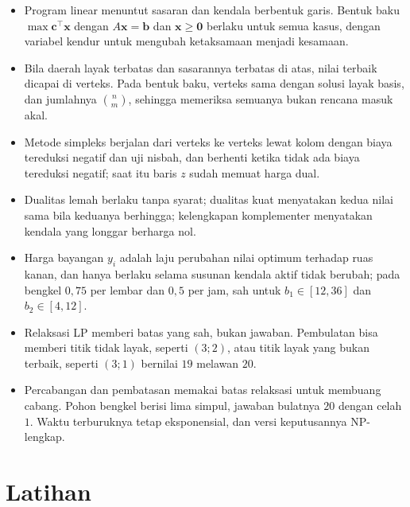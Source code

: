 \begin{ringkasan}
\begin{itemize}
  \item Program linear menuntut sasaran dan kendala berbentuk garis. Bentuk baku
        $\max\mathbf{c}^{\top}\mathbf{x}$ dengan $A\mathbf{x}=\mathbf{b}$ dan
        $\mathbf{x}\ge\mathbf{0}$ berlaku untuk semua kasus, dengan variabel kendur untuk
        mengubah ketaksamaan menjadi kesamaan.
  \item Bila daerah layak terbatas dan sasarannya terbatas di atas, nilai terbaik dicapai di
        verteks. Pada bentuk baku, verteks sama dengan solusi layak basis, dan jumlahnya
        $\binom{n}{m}$, sehingga memeriksa semuanya bukan rencana masuk akal.
  \item Metode simpleks berjalan dari verteks ke verteks lewat kolom dengan biaya tereduksi
        negatif dan uji nisbah, dan berhenti ketika tidak ada biaya tereduksi negatif; saat
        itu baris $z$ sudah memuat harga dual.
  \item Dualitas lemah berlaku tanpa syarat; dualitas kuat menyatakan kedua nilai sama bila
        keduanya berhingga; kelengkapan komplementer menyatakan kendala yang longgar
        berharga nol.
  \item Harga bayangan $y_{i}$ adalah laju perubahan nilai optimum terhadap ruas kanan, dan
        hanya berlaku selama susunan kendala aktif tidak berubah; pada bengkel $0{,}75$ per
        lembar dan $0{,}5$ per jam, sah untuk $b_{1}\in[12,36]$ dan $b_{2}\in[4,12]$.
  \item Relaksasi LP memberi batas yang sah, bukan jawaban. Pembulatan bisa memberi titik
        tidak layak, seperti $(3;2)$, atau titik layak yang bukan terbaik, seperti $(3;1)$
        bernilai $19$ melawan $20$.
  \item Percabangan dan pembatasan memakai batas relaksasi untuk membuang cabang. Pohon
        bengkel berisi lima simpul, jawaban bulatnya $20$ dengan celah $1$. Waktu terburuknya
        tetap eksponensial, dan versi keputusannya NP-lengkap.
\end{itemize}
\end{ringkasan}

\section{Latihan}

